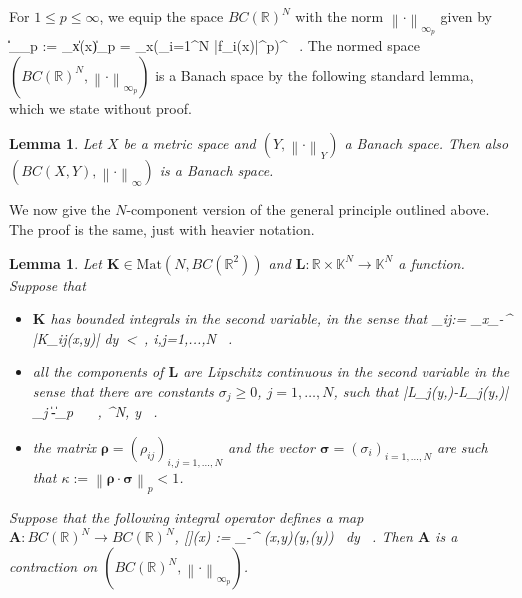 \documentclass[12pt]{article}
\theoremstyle{plain}
\newtheorem{lemma}[theorem]{Lemma}
\theoremstyle{definition}
\numberwithin{equation}{section}
\numberwithin{theorem}{section}
\def\be#1\ee{\begin{equation}#1\end{equation}}
\renewcommand{\vec}[1]{\mathbf{#1}}
\begin{document}
For $1\leq p \leq\infty$, we equip the space $BC(\mathbb{R})^N$ with the norm $\left\|\cdot\right\|_{\infty_p}$ given by \be\left\|\vec{f}\right\|_{\infty_p} := \sup_{x\in{}}\left\|\vec{f}(x)\right\|_p = \sup_{x\in{}}\left(\sum_{i=1}^N |f_i(x)|^p\right)^ \ .\ee
The normed space $\left(BC(\mathbb{R})^N, \left\|\cdot\right\|_{\infty_p}\right)$  is a Banach space by the following standard lemma, which we state without proof.

\begin{lemma} \label{B(X,Y)Banach} Let $X$ be a metric space and $(Y,\left\|\cdot\right\|_Y)$ a Banach space. 
Then also $\left(BC(X,Y),\left\|\cdot\right\|_\infty\right)$ is a Banach space.
\end{lemma}

We now give the $N$-component version of the general principle outlined above. The proof is the same, just with heavier notation.


\begin{lemma} \label{HammersteinContractionNdim} Let $\vec{K}\in\mathrm{Mat}(N,BC(\mathbb{R}^2))$ and $\vec{L}:\mathbb{R}\times\mathbb{K}^N \rightarrow\mathbb{K}^N$ a function. Suppose that 
\begin{itemize}
\item 
$\vec{K}$ has bounded integrals in the second variable, in the sense that
\be
\rho_{ij}:= \sup_{x\in{}}\int_{-\infty}^{\infty} \left|K_{ij}(x,y)\right| dy  \,<\, \infty  \qquad , \quad i,j=1,...,N \ .
\ee
\item
all the components of $\vec{L}$ are Lipschitz continuous in the second variable in the sense that there are constants $\sigma_j\geq 0$, 
$j=1,\dots,N$, such that
\be
\left|L_j(y,\vec{v})-L_j(y,\vec{w})\right| \leq \sigma_j \left\|\vec{v}-\vec{w}\right\|_p \quad {} ~~
\vec{v},\vec{w}\in
	^N, 
\; y\in{}  \ .\ee 
\item
the matrix $\boldsymbol\rho=(\rho_{ij})_{i,j=1,...,N}$ and the vector $\boldsymbol\sigma=(\sigma_i)_{i=1,...,N}$ are
such that $\kappa := \left\|\boldsymbol\rho\cdot\boldsymbol\sigma\right\|_p < 1$. 
\end{itemize}
Suppose that the following
integral operator defines a map 
$\vec{A}:BC(\mathbb{R})^N \rightarrow BC(\mathbb{R})^N$,
\be\vec{A}[\vec{f}](x) := \int_{-\infty}^{\infty} \vec{K}(x,y)\cdot\vec{L}(y,\vec{f}(y)) \, dy \ .
\ee
Then $\vec{A}$ is a contraction
on $\left(BC(\mathbb{R})^N, \left\|\cdot\right\|_{\infty_p}\right)$.
\end{lemma}
\end{document}
